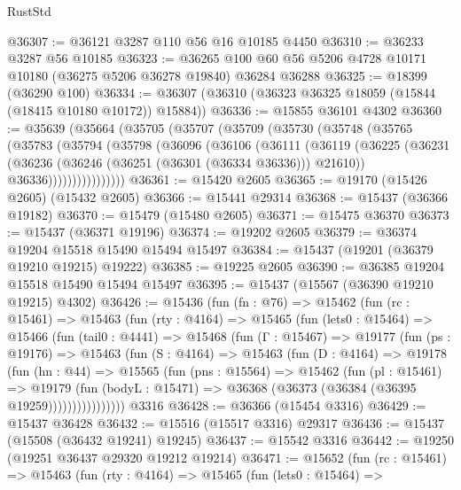 \begin{lexlean}{RustStd}
\begin{coremodule}
@36307 := @36121 @3287 @110 @56 @16 @10185 @4450
@36310 := @36233 @3287 @56 @10185
@36323 := @36265 @100 @60 @56 @5206 @4728 @10171 @10180 (@36275 @5206 @36278 @19840) @36284 @36288
@36325 := @18399 (@36290 @100)
@36334 := @36307 (@36310 (@36323 @36325 @18059 (@15844 (@18415 @10180 @10172)) @15884))
@36336 := @15855 @36101 @4302
@36360 := @35639
    (@35664
      (@35705
        (@35707
          (@35709
            (@35730
              (@35748
                (@35765
                  (@35783
                    (@35794
                      (@35798
                        (@36096
                          (@36106
                            (@36111
                              (@36119
                                (@36225
                                  (@36231
                                    (@36236 (@36246 (@36251 (@36301 (@36334 @36336))) @21610))
                                    @36336))))))))))))))))
@36361 := @15420 @2605
@36365 := @19170 (@15426 @2605) (@15432 @2605)
@36366 := @15441 @29314
@36368 := @15437 (@36366 @19182)
@36370 := @15479 (@15480 @2605)
@36371 := @15475 @36370
@36373 := @15437 (@36371 @19196)
@36374 := @19202 @2605
@36379 := @36374 @19204 @15518 @15490 @15494 @15497
@36384 := @15437 (@19201 (@36379 @19210 @19215) @19222)
@36385 := @19225 @2605
@36390 := @36385 @19204 @15518 @15490 @15494 @15497
@36395 := @15437 (@15567 (@36390 @19210 @19215) @4302)
@36426 := @15436
    (fun (fn : @76) =>
    @15462
      (fun (rc : @15461) =>
      @15463
        (fun (rty : @4164) =>
        @15465
          (fun (lets0 : @15464) =>
          @15466
            (fun (tail0 : @4441) =>
            @15468
              (fun (Γ : @15467) =>
              @19177
                (fun (ps : @19176) =>
                @15463
                  (fun (S : @4164) =>
                  @15463
                    (fun (D : @4164) =>
                    @19178
                      (fun (hn : @44) =>
                      @15565
                        (fun (pns : @15564) =>
                        @15462
                          (fun (pl : @15461) =>
                          @19179
                            (fun (bodyL : @15471) =>
                            @36368 (@36373 (@36384 (@36395 @19259))))))))))))))))
    @3316
@36428 := @36366 (@15454 @3316)
@36429 := @15437 @36428
@36432 := @15516 (@15517 @3316) @29317
@36436 := @15437 (@15508 (@36432 @19241) @19245)
@36437 := @15542 @3316
@36442 := @19250 (@19251 @36437 @29320 @19212 @19214)
@36471 := @15652
    (fun (rc : @15461) =>
    @15463
      (fun (rty : @4164) =>
      @15465
        (fun (lets0 : @15464) =>

\end{coremodule}
\end{lexlean}
